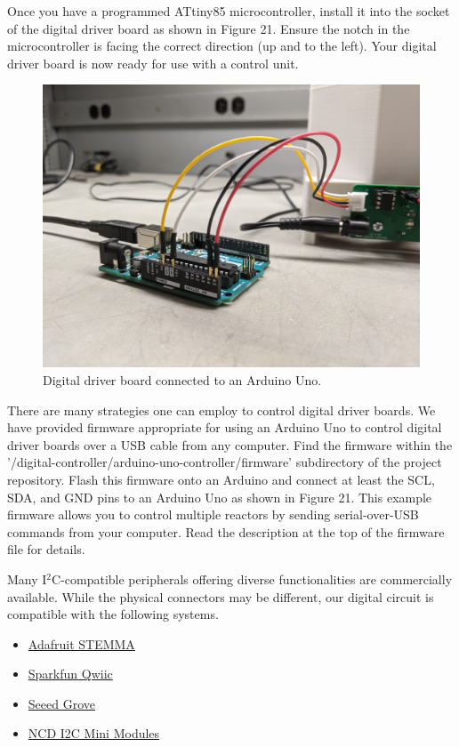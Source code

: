 \documentclass[11pt]{article}
\begin{document}
Once you have a programmed ATtiny85 microcontroller, install it into the socket of the digital driver board as shown in Figure 21.
Ensure the notch in the microcontroller is facing the correct direction (up and to the left).
Your digital driver board is now ready for use with a control unit.

\begin{figure}[H]
	\centering
	\includegraphics[width=\textwidth/2]{"./arduino-interface.jpg"}
	\caption{Digital driver board connected to an Arduino Uno.}
\end{figure}

\clearpage

There are many strategies one can employ to control digital driver boards.
We have provided firmware appropriate for using an Arduino Uno to control digital driver boards over a USB cable from any computer.
Find the firmware within the '/digital-controller/arduino-uno-controller/firmware' subdirectory of the project repository.
Flash this firmware onto an Arduino and connect at least the SCL, SDA, and GND pins to an Arduino Uno as shown in Figure 21.
This example firmware allows you to control multiple reactors by sending serial-over-USB commands from your computer.
Read the description at the top of the firmware file for details.

Many I$^2$C-compatible peripherals offering diverse functionalities are commercially available.
While the physical connectors may be different, our digital circuit is compatible with the following systems.

\begin{itemize}
  \item \href{https://learn.adafruit.com/introducing-adafruit-stemma-qt}{Adafruit STEMMA}
  \item \href{https://www.sparkfun.com/qwiic}{Sparkfun Qwiic}
  \item \href{https://www.seeedstudio.com/category/Grove-c-1003.html}{Seeed Grove}
  \item \href{https://store.ncd.io/?fwp_product_type=i2c-mini-modules}{NCD I2C Mini Modules}
\end{itemize}
\end{document}
